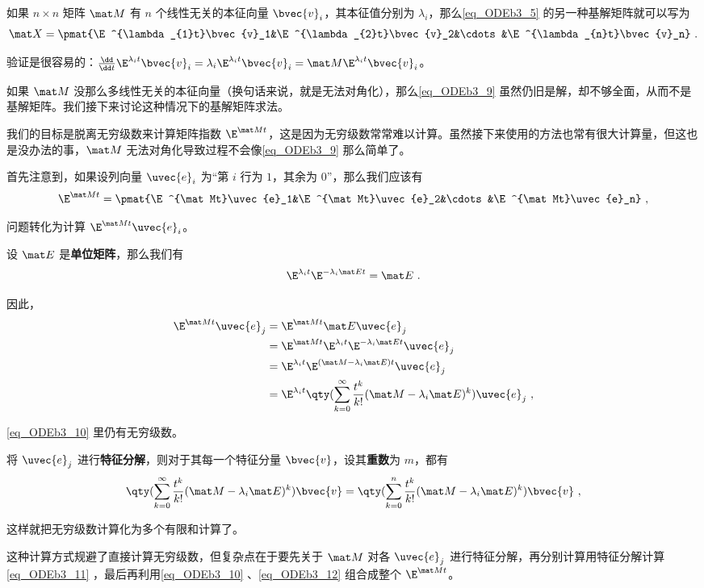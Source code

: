 如果 $n\times n$ 矩阵 $\mat M$ 有 $n$ 个线性无关的本征向量 $\bvec{v}_i$，其本征值分别为 $\lambda_i$，那么\autoref{eq_ODEb3_5} 的另一种基解矩阵就可以写为
\begin{equation}\label{eq_ODEb3_9}
\mat X=\pmat{\E^{\lambda_{1}t}\bvec{v}_1&\E^{\lambda_{2}t}\bvec{v}_2&\cdots&\E^{\lambda_{n}t}\bvec{v}_n}~.
\end{equation}

验证是很容易的：$\frac{\dd}{\dd t}\E^{\lambda_{i}t}\bvec{v}_i=\lambda_i\E^{\lambda_{i}t}\bvec{v}_i=\mat M\E^{\lambda_{i}t}\bvec{v}_i$。

如果 $\mat M$ 没那么多线性无关的本征向量（换句话来说，就是无法对角化），那么\autoref{eq_ODEb3_9} 虽然仍旧是解，却不够全面，从而不是基解矩阵。我们接下来讨论这种情况下的基解矩阵求法。

我们的目标是脱离无穷级数来计算矩阵指数 $\E^{\mat Mt}$，这是因为无穷级数常常难以计算。虽然接下来使用的方法也常有很大计算量，但这也是没办法的事，$\mat M$ 无法对角化导致过程不会像\autoref{eq_ODEb3_9} 那么简单了。

首先注意到，如果设列向量 $\uvec{e}_i$ 为“第 $i$ 行为 $1$，其余为 $0$”，那么我们应该有
\begin{equation}\label{eq_ODEb3_12}
\E^{\mat Mt}=\pmat{\E^{\mat Mt}\uvec{e}_1&\E^{\mat Mt}\uvec{e}_2&\cdots&\E^{\mat Mt}\uvec{e}_n}~,
\end{equation}

问题转化为计算 $\E^{\mat Mt}\uvec{e}_i$。

设 $\mat E$ 是\textbf{单位矩阵}，那么我们有
\begin{equation}
\E^{\lambda_it}\E^{-\lambda_i\mat Et}=\mat E~.
\end{equation}

因此，
\begin{equation}\label{eq_ODEb3_10}
\begin{aligned}
\E^{\mat Mt}\uvec{e}_j&=\E^{\mat Mt}\mat E\uvec{e}_j\\
&=\E^{\mat Mt}\E^{\lambda_it}\E^{-\lambda_i\mat Et}\uvec{e}_j\\
&=\E^{\lambda_it}\E^{(\mat M-\lambda_i\mat E)t}\uvec{e}_j\\
&=\E^{\lambda_it}\qty(\sum_{k=0}^\infty \frac{t^k}{k!}(\mat M-\lambda_i\mat E)^k)\uvec{e}_j~,
\end{aligned}
\end{equation}

\autoref{eq_ODEb3_10} 里仍有无穷级数。

将 $\uvec{e}_j$ 进行\textbf{特征分解}，则对于其每一个特征分量 $\bvec{v}$，设其\textbf{重数}为 $m$，都有
\begin{equation}\label{eq_ODEb3_11}
\qty(\sum_{k=0}^\infty \frac{t^k}{k!}(\mat M-\lambda_i\mat E)^k)\bvec{v}=\qty(\sum_{k=0}^n \frac{t^k}{k!}(\mat M-\lambda_i\mat E)^k)\bvec{v}~,
\end{equation}

这样就把无穷级数计算化为多个有限和计算了。

这种计算方式规避了直接计算无穷级数，但复杂点在于要先关于 $\mat M$ 对各 $\uvec{e}_j$ 进行特征分解，再分别计算用特征分解计算\autoref{eq_ODEb3_11} ，最后再利用\autoref{eq_ODEb3_10} 、\autoref{eq_ODEb3_12} 组合成整个 $\E^{\mat Mt}$。









